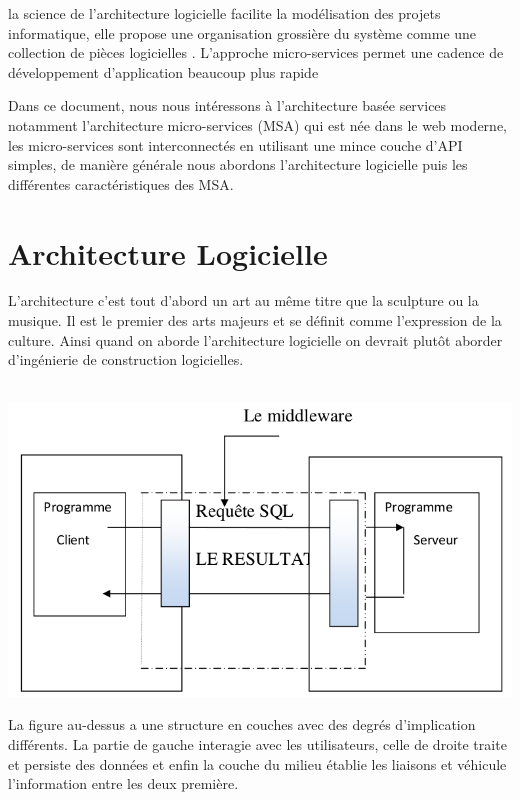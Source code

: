 \documentclass[12pt, a4paper, openany]{report}
\begin{document}
   la science de l’architecture logicielle facilite la modélisation des projets informatique, elle propose une organisation grossière du système comme une collection de pièces logicielles \cite{refbibFoundations}. L'approche micro-services permet une cadence de développement d'application beaucoup plus rapide
  
  
  Dans ce document, nous nous intéressons à l'architecture basée services notamment l'architecture micro-services (MSA) qui est née dans le web moderne, les micro-services sont interconnectés en utilisant une mince couche d'API simples, de manière générale nous abordons l'architecture logicielle puis les différentes caractéristiques des MSA.
                                                      
   

\chapter{Architecture Logicielle}
 L’architecture c’est tout d’abord un art au même titre que la sculpture ou la musique. Il est le premier des arts majeurs et se définit comme l’expression de la culture. Ainsi quand on aborde l’architecture logicielle on devrait plutôt aborder d’ingénierie de construction logicielles.\\ \\
 \begin{center}
   \includegraphics[scale=0.5]{exemple_archi_1.png}
   \label{fig1}
 \end{center}
 
 La figure au-dessus a une structure en couches avec des degrés d’implication différents. La partie de gauche interagie avec les utilisateurs, celle de droite traite et persiste des données et enfin la couche du milieu établie les liaisons  et véhicule l’information entre les deux première.\\
 
\end{document}
